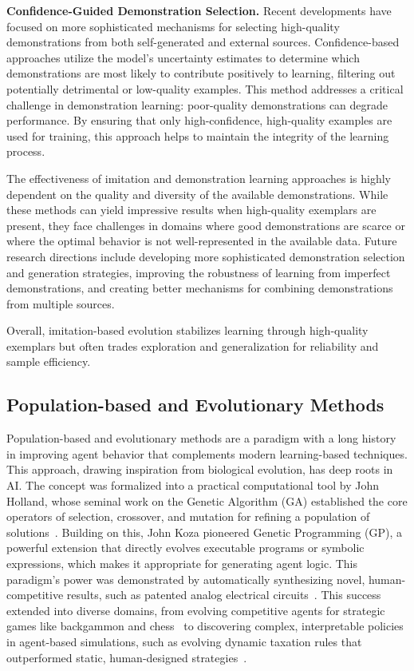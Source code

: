 \documentclass[10pt]{article} %
\begin{document}
\textbf{Confidence-Guided Demonstration Selection.} 
Recent developments have focused on more sophisticated mechanisms for selecting high-quality demonstrations from both self-generated and external sources. Confidence-based approaches \citep{li2024confidence} utilize the model's uncertainty estimates to determine which demonstrations are most likely to contribute positively to learning, filtering out potentially detrimental or low-quality examples. This method addresses a critical challenge in demonstration learning: poor-quality demonstrations can degrade performance. By ensuring that only high-confidence, high-quality examples are used for training, this approach helps to maintain the integrity of the learning process.

The effectiveness of imitation and demonstration learning approaches is highly dependent on the quality and diversity of the available demonstrations. While these methods can yield impressive results when high-quality exemplars are present, they face challenges in domains where good demonstrations are scarce or where the optimal behavior is not well-represented in the available data. Future research directions include developing more sophisticated demonstration selection and generation strategies, improving the robustness of learning from imperfect demonstrations, and creating better mechanisms for combining demonstrations from multiple sources.



Overall, imitation-based evolution stabilizes learning through high-quality exemplars but often trades exploration and generalization for reliability and sample efficiency.


\subsection{Population-based and Evolutionary Methods}


Population-based and evolutionary methods are a paradigm with a long history in improving agent behavior that complements modern learning-based techniques. This approach, drawing inspiration from biological evolution, has deep roots in AI. The concept was formalized into a practical computational tool by John Holland, whose seminal work on the Genetic Algorithm (GA) established the core operators of selection, crossover, and mutation for refining a population of solutions~\citep{holland1976adaptation}. Building on this, John Koza pioneered Genetic Programming (GP), a powerful extension that directly evolves executable programs or symbolic expressions, which makes it appropriate for generating agent logic. This paradigm's power was demonstrated by automatically synthesizing novel, human-competitive results, such as patented analog electrical circuits~\citep{koza2010human}. This success extended into diverse domains, from evolving competitive agents for strategic games like backgammon and chess~\citep{hauptman2007evolution, azaria2005gpgammon} to discovering complex, interpretable policies in agent-based simulations, such as evolving dynamic taxation rules that outperformed static, human-designed strategies~\citep{garuccio2016genetic}.
\end{document}
